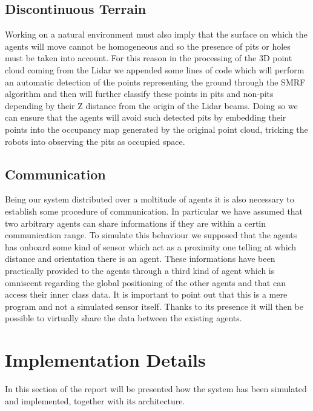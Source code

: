 \documentclass[twocolumn, a4paper]{article}
\begin{document}
\subsection{Discontinuous Terrain}
Working on a natural environment must also imply that the surface on which the
agents will move cannot be homogeneous and so the presence of pits or holes
must be taken into account.
For this reason in the processing of the 3D point cloud coming from the Lidar
we appended some lines of code which will perform an automatic detection
of the points representing the ground through the SMRF algorithm and
then will further classify these points in pits and non-pits depending by
their Z distance from the origin of the Lidar beams. Doing so we can ensure
that the agents will avoid such detected pits by embedding their points into
the occupancy map generated by the original point cloud, tricking the robots
into observing the pits as occupied space.

\subsection{Communication}
Being our system distributed over a moltitude of agents it is also necessary
to establish some procedure of communication. In particular we have assumed
that two arbitrary agents can share informations if they are within a certin
communication range. To simulate this behaviour we supposed that the agents
has onboard some kind of sensor which act as a proximity one telling at
which distance and orientation there is an agent. These informations have
been practically provided to the agents through a third kind of agent
which is omniscent regarding the global positioning of the other agents
and that can access their inner class data. It is important to point out
that this is a mere program and not a simulated sensor itself.
Thanks to its presence it will then be possible to virtually share the data
between the existing agents.

\section{Implementation Details}
In this section of the report will be presented how the system has been
simulated and implemented, together with its architecture.
\end{document}
